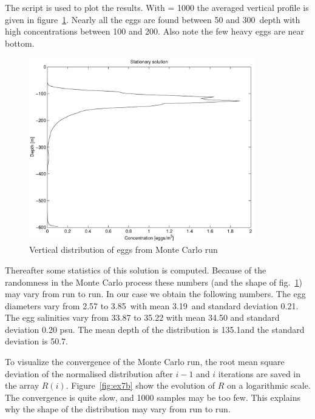 The script  is used to plot the results.
With  = 1000 the averaged vertical profile is given
in figure~\ref{fig:ex7a}. Nearly all the eggs are found 
between 50 and 300\m\ depth with high concentrations between 
100 and 200\m. Also note the few heavy eggs are  near bottom.

\begin{figure}[!htb]
\begin{center}
\includegraphics[height=8cm]{ex7a}
\end{center}
\caption{Vertical distribution of eggs from Monte Carlo run}
\label{fig:ex7a}
\end{figure}

Thereafter some statistics of this solution
is computed. Because of the randomness in the Monte Carlo process
these numbers (and the shape of fig.~\ref{fig:ex7a}) may vary from run
to run. In our case we obtain the following numbers. The egg diameters vary
from 2.57 to 3.85\mm\ with mean 3.19\mm\ and standard deviation
0.21\mm. The egg salinities vary from 33.87 to 35.22  with mean
34.50 and standard deviation 0.20 psu. The mean depth of the
distribution is 135.1\m and the standard deviation is 50.7\m.

To visualize the convergence of the Monte Carlo run, the root mean
square deviation of the normalised distribution after $i-1$ and $i$
iterations are saved in the array $R(i)$. Figure~\ref{fig:ex7b}
show the evolution of $R$ on a logarithmic scale. The convergence is 
quite slow, and 1000 samples may be too few. This explains why the
shape of the distribution may vary from run to run.

